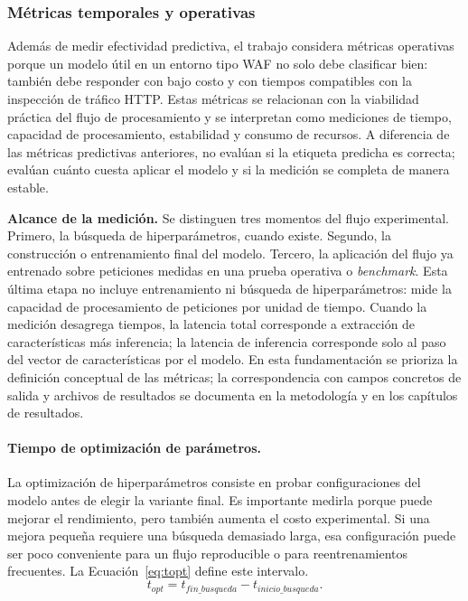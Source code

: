 \documentclass[12pt,oneside]{report}
\begin{document}
\subsubsection{Métricas temporales y operativas}

Además de medir efectividad predictiva, el trabajo considera métricas operativas porque un modelo útil en un entorno tipo WAF no solo debe clasificar bien: también debe responder con bajo costo y con tiempos compatibles con la inspección de tráfico HTTP. Estas métricas se relacionan con la viabilidad práctica del flujo de procesamiento y se interpretan como mediciones de tiempo, capacidad de procesamiento, estabilidad y consumo de recursos. A diferencia de las métricas predictivas anteriores, no evalúan si la etiqueta predicha es correcta; evalúan cuánto cuesta aplicar el modelo y si la medición se completa de manera estable.

\textbf{Alcance de la medición.} Se distinguen tres momentos del flujo experimental. Primero, la búsqueda de hiperparámetros, cuando existe. Segundo, la construcción o entrenamiento final del modelo. Tercero, la aplicación del flujo ya entrenado sobre peticiones medidas en una prueba operativa o \emph{benchmark}. Esta última etapa no incluye entrenamiento ni búsqueda de hiperparámetros: mide la capacidad de procesamiento de peticiones por unidad de tiempo. Cuando la medición desagrega tiempos, la latencia total corresponde a extracción de características más inferencia; la latencia de inferencia corresponde solo al paso del vector de características por el modelo. En esta fundamentación se prioriza la definición conceptual de las métricas; la correspondencia con campos concretos de salida y archivos de resultados se documenta en la metodología y en los capítulos de resultados.

\paragraph{Tiempo de optimización de parámetros.}
La optimización de hiperparámetros consiste en probar configuraciones del modelo antes de elegir la variante final. Es importante medirla porque puede mejorar el rendimiento, pero también aumenta el costo experimental. Si una mejora pequeña requiere una búsqueda demasiado larga, esa configuración puede ser poco conveniente para un flujo reproducible o para reentrenamientos frecuentes. La Ecuación~\eqref{eq:topt} define este intervalo.
\begin{equation}
\label{eq:topt}
t_{opt}=t_{fin\_busqueda}-t_{inicio\_busqueda}.
\end{equation}
\end{document}
